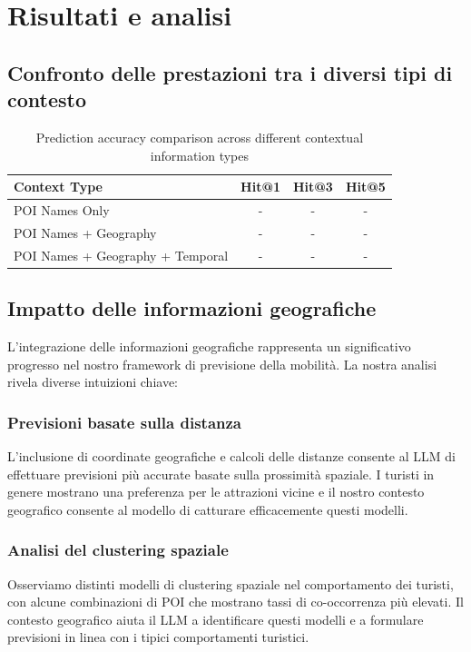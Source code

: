 \documentclass[12pt,a4paper]{article}
\begin{document}
\newpage

\section{Risultati e analisi}

\subsection{Confronto delle prestazioni tra i diversi tipi di contesto}

\begin{table}[H]
\centering
\caption{Prediction accuracy comparison across different contextual information types}
\label{tab:context_comparison}
\begin{tabular}{@{}lccc@{}}
\toprule
Context Type & Hit@1 & Hit@3 & Hit@5 \\
\midrule
POI Names Only & - & - & - \\
POI Names + Geography & - & - & - \\
POI Names + Geography + Temporal & - & - & - \\
\bottomrule
\end{tabular}
\end{table}

\subsection{Impatto delle informazioni geografiche}

L'integrazione delle informazioni geografiche rappresenta un significativo progresso nel nostro framework di previsione della mobilità. La nostra analisi rivela diverse intuizioni chiave:

\subsubsection{Previsioni basate sulla distanza}
L'inclusione di coordinate geografiche e calcoli delle distanze consente al LLM di effettuare previsioni più accurate basate sulla prossimità spaziale. I turisti in genere mostrano una preferenza per le attrazioni vicine e il nostro contesto geografico consente al modello di catturare efficacemente questi modelli.

\subsubsection{Analisi del clustering spaziale}
Osserviamo distinti modelli di clustering spaziale nel comportamento dei turisti, con alcune combinazioni di POI che mostrano tassi di co-occorrenza più elevati. Il contesto geografico aiuta il LLM a identificare questi modelli e a formulare previsioni in linea con i tipici comportamenti turistici.
\end{document}
